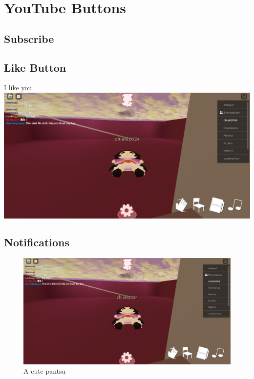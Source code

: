 \chapter{YouTube Buttons}
\section{Subscribe}
\section{Like Button}
I like you
\includegraphics[width=1\textwidth]{pantsu.png}
\section{Notifications}
\begin{figure}[ht]
    \centering
    \includegraphics[width=1\textwidth]{pantsu.png}
    \caption{A cute pantsu}
\end{figure}
